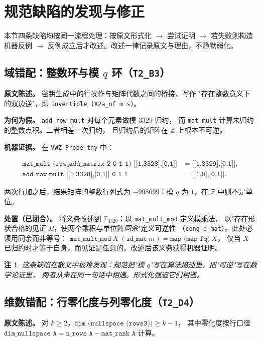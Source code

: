 \documentclass[UTF8,fontset=windows,zihao=-4,a4paper]{ctexart}
\newtheorem{remark}{注}
\newcommand{\code}[1]{\texttt{#1}}
\newcommand{\Fq}{\mathbb{F}_{3329}}
\begin{document}
\section{规范缺陷的发现与修正}
\label{sec:defects}

本节四条缺陷均按同一流程处理：按原文形式化 $\to$ 尝试证明 $\to$ 若失败则构造机器反例
$\to$ 反例成立后才改述。改述一律记录原文与理由，不静默弱化。

\subsection{域错配：整数环与模 $q$ 环（\code{T2\_B3}）}
\textbf{原文陈述。} 密钥生成中的行操作与矩阵代数之间的桥接，写作
"存在整数意义下的双边逆"，即 \code{invertible (X2a\_of m s)}。

\textbf{为何为假。} \code{add\_row\_mult} 对每个元素做模 3329 归约，
而 \code{mat\_mult} 计算未归约的整数点积。二者相差一次归约，
且归约后的矩阵在 $\mathbb{Z}$ 上根本不可逆。

\textbf{机器证据。} 在 \code{VWZ\_Probe.thy} 中：
\begin{small}
\begin{align*}
  \code{mat\_mult (row\_add\_matrix 2 0 1 1) [[1,3328],[0,1]]} &= \code{[[1,3329],[0,1]]},\\
  \code{add\_row\_mult [[1,3328],[0,1]] 0 1 1} &= \code{[[1,0],[0,1]]}.
\end{align*}
\end{small}
两次行加之后，结果矩阵的整数行列式为 $-998699$：模 $q$ 为 $1$，在 $\mathbb{Z}$ 中则不是单位。

\textbf{处置（已闭合）。} 将义务改述到 $\Fq$：以 \code{mat\_mult\_mod} 定义模乘法，
以"存在形状合格的见证 $B$，使两个乘积与单位阵\emph{同余}"定义可逆性
（\code{cong\_q\_mat}）。此处必须用同余而非等号：
$\code{mat\_mult\_mod}\ X\ (\code{id\_mat}\ m) = \code{map (map fq)}\ X$，
仅当 $X$ 已归约时才等于自身，而见证是任意的。改述后该义务获得机器证明。

\begin{remark}
这条缺陷在散文中极难发现：规范把"模 $q$"写在算法描述里，把"可逆"写在数学论证里，
两者从未在同一句话中相遇。形式化强迫它们相遇。
\end{remark}

\subsection{维数错配：行零化度与列零化度（\code{T2\_D4}）}
\textbf{原文陈述。} 对 $k \ge 2$，$\code{dim (nullspace (rows3))} \ge k-1$，
其中零化度按行口径 $\code{dim\_nullspace A} = \code{n\_rows A} - \code{mat\_rank A}$ 计算。
\end{document}
